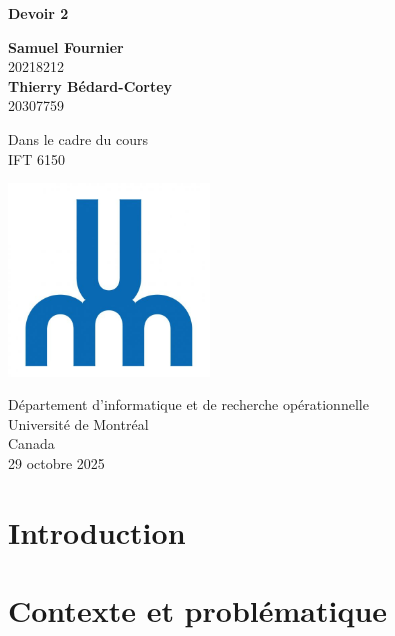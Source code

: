 \documentclass{article}
\begin{document}
\begin{titlepage}
	\begin{center}
		\vspace*{1cm}

		\Huge
		\textbf{Devoir 2}

		\vspace{0.5cm}
		\LARGE

		\vspace{1.5cm}

        
		\textbf{Samuel Fournier}\\20218212 \\
		\vfill
		\textbf{Thierry Bédard-Cortey}\\20307759 \\
		\vfill


		Dans le cadre du cours\\
		IFT 6150


		\vspace{0.8cm}

		\includegraphics[width=0.4\textwidth]{udem.jpg}

		\Large
		Département d'informatique et de recherche opérationnelle\\
		Université de Montréal\\
		Canada\\
		29 octobre 2025

	\end{center}
\end{titlepage}

\section{Introduction}

\section{Contexte et problématique}
\end{document}
